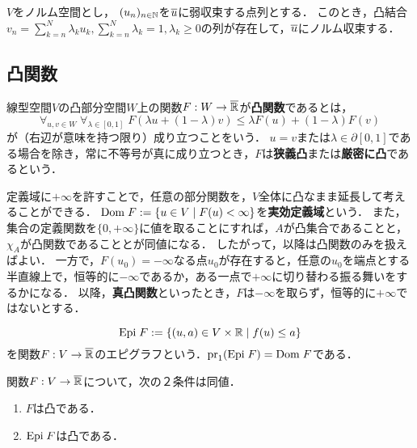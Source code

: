 \documentclass[uplatex,dvipdfmx]{jsreport}
\begin{document}
\begin{lemma}
    $V$をノルム空間とし，
    $(u_n)_{n\in\mathbb{N}}$を$\overline{u}$に弱収束する点列とする．
    このとき，凸結合$v_n=\sum^N_{k=n}\lambda_ku_k,\sum^N_{k=n}\lambda_k=1,\lambda_k\ge0$の列が存在して，$\overline{u}$にノルム収束する．
\end{lemma}

\subsection{凸関数}

\begin{definition}
    線型空間$V$の凸部分空間$W$上の関数$F:W\to\overline{\mathbb{R}}$が\textbf{凸関数}であるとは，
    \[\forall_{u,v\in W}\;\forall_{\lambda\in[0,1]}\;F(\lambda u+(1-\lambda)v)\le\lambda F(u)+(1-\lambda)F(v)\]
    が（右辺が意味を持つ限り）成り立つことをいう．
    $u=v$または$\lambda\in\partial[0,1]$である場合を除き，常に不等号が真に成り立つとき，$F$は\textbf{狭義凸}または\textbf{厳密に凸}であるという．
\end{definition}
\begin{remarks}
    定義域に$+\infty$を許すことで，任意の部分関数を，$V$全体に凸なまま延長して考えることができる．
    $\mathrm{Dom}\; F:=\left\{u\in V\mid F(u)<\infty\right\}$を\textbf{実効定義域}という．
    また，集合の定義関数を$\{0,+\infty\}$に値を取ることにすれば，$A$が凸集合であることと，$\chi_A$が凸関数であることとが同値になる．
    したがって，以降は凸関数のみを扱えばよい．
    一方で，$F(u_0)=-\infty$なる点$u_0$が存在すると，任意の$u_0$を端点とする半直線上で，恒等的に$-\infty$であるか，ある一点で$+\infty$に切り替わる振る舞いをするかになる．
    以降，\textbf{真凸関数}といったとき，$F$は$-\infty$を取らず，恒等的に$+\infty$ではないとする．
\end{remarks}

\begin{definition}[epigraph]
    \[\mathrm{Epi}\; F:=\left\{(u,a)\in V\times\mathbb{R}\mid f(u)\le a\right\}\]
    を関数$F:V\to\overline{\mathbb{R}}$のエピグラフという．$\mathrm{pr}_1(\mathrm{Epi}\; F)=\mathrm{Dom}\; F$である．
\end{definition}

\begin{proposition}[凸関数の特徴付け]
    関数$F:V\to\overline{\mathbb{R}}$について，次の２条件は同値．
    \begin{enumerate}
        \item $F$は凸である．
        \item $\mathrm{Epi}\; F$は凸である．
    \end{enumerate}
\end{proposition}
\end{document}
